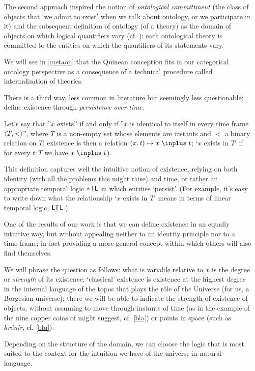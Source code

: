 The second approach inspired the notion of \emph{ontological committment} (the class of objects that `we admit to exist' when we talk about ontology, or we participate in it) and the subsequent definition of ontology (of a theory) as the domain of objects on which logical quantifiers vary (cf. \cite{Qui53}): each ontological theory is committed to the entities on which the quantifiers of its statements vary.

We will see in \autoref{metaon} that the Quinean conception fits in our categorical ontology perspective as a consequence of a technical procedure called internalization of theories.

There is a third way, less common in literature but seemingly less questionable: define existence through \emph{persistence over time}.

Let's say that ''$x$ exists'' if and only if ''$x$ is identical to itself in every time frame $\langle T, <\rangle$'', where $T$ is a non-empty set whose elements are instants and $<$ a binary relation on $T$; existence is then a relation $ (x, t) \mapsto x \mathrel \inplus t $; `$ x $ exists in $ T $' if for every $ t: T $ we have $ x \mathrel \inplus t $).

This definition captures well the intuitive notion of existence, relying on both identity (with all the problems this might raise) and time, or rather an appropriate temporal logic $\sf *TL$ in which entities `persist'. (For example, it's easy to write down what the relationship `$x$ exists in $T$' means in terms of linear temporal logic, $\sf LTL$.)

One of the results of our work is that we can define existence in an equally intuitive way, but without appealing neither to an identity principle nor to a time-frame; in fact providing a more general concept within which others will also find themselves.

We will phrase the question as follows: what is variable relative to $x$ is the degree or \emph{strength} of its existence; `classical' existence is existence at the highest degree in the internal language of the topos that plays the r\^ole of the Universe (for us, a Borgesian universe); there we will be able to indicate the strength of existence of objects, without assuming to move through instants of time (as in the example of the nine copper coins of \cite{tlonEN} might suggest, cf. \autoref{bla}) or points in space (such as \emph{hr\"onir}, cf. \autoref{blu}).

Depending on the structure of the domain, we can choose the logic that is most suited to the context for the intuition we have of the universe in natural language.

